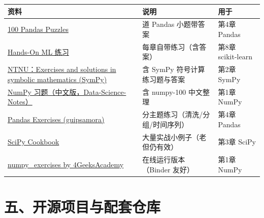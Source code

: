 {\def\LTcaptype{none} %
\begin{longtable}[]{@{}
  >{\raggedright\arraybackslash}p{}
  >{\raggedright\arraybackslash}p{}
  >{\raggedright\arraybackslash}p{}@{}}
\toprule\noalign{}
\begin{minipage}[b]{\linewidth}\raggedright
资料
\end{minipage} & \begin{minipage}[b]{\linewidth}\raggedright
说明
\end{minipage} & \begin{minipage}[b]{\linewidth}\raggedright
用于
\end{minipage} \\
\midrule\noalign{}
\endhead
\bottomrule\noalign{}
\endlastfoot
\href{https://github.com/ajcr/100-pandas-puzzles}{100 Pandas Puzzles} &
100 道 Pandas 小题带答案 & 第4章 Pandas \\
\href{https://github.com/ageron/handson-ml3}{Hands-On ML 练习} &
每章自带练习（含答案） & 第8章 scikit-learn \\
\href{https://www.ntnu.no/wiki/spaces/imtsoftware/pages/148770976/Exercises+and+solutions+symbolic+mathematics+in+Python}{NTNU：Exercises
and solutions in symbolic mathematics (SymPy)} & 含 SymPy
符号计算练习题与答案 & 第2章 SymPy \\
\href{https://github.com/fengdu78/Data-Science-Notes}{NumPy
习题（中文版，Data-Science-Notes）} & 含 numpy-100 中文整理 & 第1章
NumPy \\
\href{https://github.com/guipsamora/pandas_exercises}{Pandas Exercises
(guipsamora)} & 分主题练习（清洗/分组/时间序列） & 第4章 Pandas \\
\href{https://scipy.github.io/old-wiki/pages/Cookbook/}{SciPy Cookbook}
& 大量实战小例子（老但仍有效） & 第3章 SciPy \\
\href{https://github.com/4GeeksAcademy/numpy-100}{numpy\_exercises by
4GeeksAcademy} & 在线运行版本（Binder 友好） & 第1章 NumPy \\
\end{longtable}
}

\section{五、开源项目与配套仓库}\label{ux4e94ux5f00ux6e90ux9879ux76eeux4e0eux914dux5957ux4ed3ux5e93}

